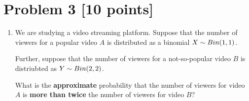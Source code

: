 \newpage
\section{Problem 3 [10 points]}

\begin{enumerate}[label=\alph*.]

\item 


We are studying a video streaming platform. Suppose that the number of viewers for a popular video $A$ is distributed as a binomial $X \sim Bin(1{}, 1{})$. 

Further, suppose that the number of viewers for a not-so-popular video $B$ is distriubted as $Y \sim Bin(2{}, 2{})$.

What is the \textbf{approximate} probability that the number of viewers for video $A$ is \textbf{more than twice} the number of viewers for video $B$?

		


\end{enumerate}